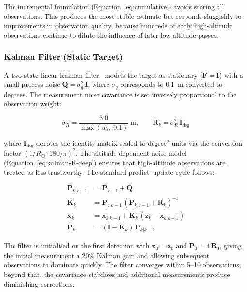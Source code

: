 \noindent The incremental formulation (Equation~\ref{eq:cumulative}) avoids storing all observations.  This produces the most stable estimate but responds sluggishly to improvements in observation quality, because hundreds of early high-altitude observations continue to dilute the influence of later low-altitude passes.

\subsubsection{Kalman Filter (Static Target)}\label{sec:kalman-deep}

A two-state linear Kalman filter~\cite{kalman1960} models the target as stationary ($\mathbf{F} = \mathbf{I}$) with a small process noise $\mathbf{Q} = \sigma_q^2\,\mathbf{I}$, where $\sigma_q$ corresponds to \SI{0.1}{\metre} converted to degrees.  The measurement noise covariance is set inversely proportional to the observation weight:

\begin{equation}\label{eq:kalman-R-deep}
  \sigma_R = \frac{3.0}{\max(w_i,\; 0.1)}\;\text{m},
  \qquad
  \mathbf{R}_k = \sigma_R^2\,\mathbf{I}_{\deg}
\end{equation}

\noindent where $\mathbf{I}_{\deg}$ denotes the identity matrix scaled to degree$^2$ units via the conversion factor $(1 / R_\oplus \cdot 180/\pi)^2$.  The altitude-dependent noise model (Equation~\ref{eq:kalman-R-deep}) ensures that high-altitude observations are treated as less trustworthy.  The standard predict--update cycle follows:

\begin{align}
  \mathbf{P}_{k|k-1} &= \mathbf{P}_{k-1} + \mathbf{Q} \\
  \mathbf{K}_k &= \mathbf{P}_{k|k-1}\,(\mathbf{P}_{k|k-1} + \mathbf{R}_k)^{-1} \\
  \mathbf{x}_k &= \mathbf{x}_{k|k-1} + \mathbf{K}_k\,(\mathbf{z}_k - \mathbf{x}_{k|k-1}) \\
  \mathbf{P}_k &= (\mathbf{I} - \mathbf{K}_k)\,\mathbf{P}_{k|k-1}
\end{align}

\noindent The filter is initialised on the first detection with $\mathbf{x}_0 = \mathbf{z}_0$ and $\mathbf{P}_0 = 4\,\mathbf{R}_0$, giving the initial measurement a 20\% Kalman gain and allowing subsequent observations to dominate quickly.  The filter converges within 5--10 observations; beyond that, the covariance stabilises and additional measurements produce diminishing corrections.

